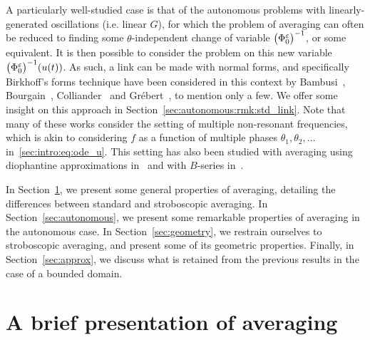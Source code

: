 \medskip%
A particularly well-studied case is that of the autonomous problems with
linearly-generated oscillations (i.e. linear $G$), for which the problem
of averaging can often be reduced to finding some $\theta$-independent
change of variable $\big( \Phi^{\varepsilon}_0 \big) ^{-1}$, or some equivalent. It
is then possible to consider the problem on this new variable
$\big(\Phi^{\varepsilon}_0 \big)^{-1} (u(t))$. As such, a link can be made with
normal forms, and specifically Birkhoff's forms technique have been
considered in this context by Bambusi~\cite{bambusi.2003.birkhoff, bambusi.2005.birkhoff-lewis, bambusi.2006.birkhoff, bambusi.2008.birkhoff},
Bourgain~\cite{bourgain.1996.construction},
Colliander~\cite{colliander.2010.transfer, colliander.2012.remark} and
Grébert~\cite{bambusi.2006.birkhoff, grebert.2011.energy,
grebert.2012.resonant}, to mention only a few. We offer some insight on
this approach in Section~\ref{sec:autonomous:rmk:std_link}.
%
Note that many of these works consider the setting of multiple
non-resonant frequencies, which is akin to considering $f$ as a function
of multiple phases $\theta_1, \theta_2, \ldots$
in~\eqref{sec:intro:eq:ode_u}. This setting has also been studied with
averaging using diophantine approximations
in~\cite{chartier.2017.convergence} and with $B$-series
in~\cite{chartier.2012.higher}. 

\bigskip %
In Section~\ref{sec:presentation}, we present some general properties of
averaging, detailing the differences between standard and stroboscopic
averaging. In Section~\ref{sec:autonomous}, we present some remarkable
properties of averaging in the autonomous case. In
Section~\ref{sec:geometry}, we restrain ourselves to stroboscopic
averaging, and present some of its geometric properties. Finally, in
Section~\ref{sec:approx}, we discuss what is retained from the previous
results in the case of a bounded domain. 


\section{A brief presentation of averaging} \label{sec:presentation}



